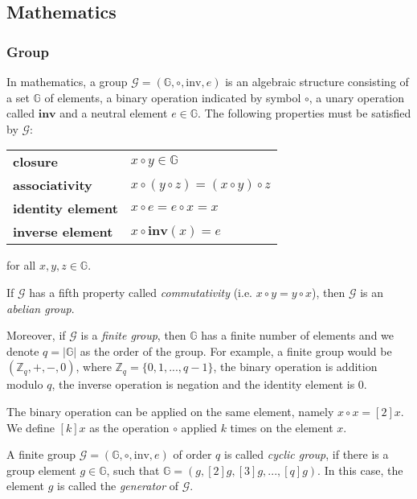 \subsection{Mathematics} \label{app: mathematics}


\subsubsection{Group}
In mathematics, a group $\mathcal{G} = (\mathbb{G}, \circ, \mathrm{inv}, e)$ is an algebraic structure consisting of a set $\mathbb{G}$ of elements, a binary operation indicated by symbol $\circ$, a unary operation called $\mathbf{inv}$ and a neutral element $e \in \mathbb{G}$. The following properties must be satisfied by $\mathcal{G}$:

\begin{center}
\begin{tabular}{ l l }
 \textbf{closure} & $x \circ y \in \mathbb{G}$ \\ 
 \textbf{associativity} & $x \circ (y \circ z) = (x \circ y) \circ z$ \\  
 \textbf{identity element} & $x \circ e = e \circ x = x$ \\
 \textbf{inverse element} & $x \circ \mathbf{inv}(x) = e$
\end{tabular}
\end{center}
for all $x, y, z \in \mathbb{G}$.

If $\mathcal{G}$ has a fifth property called \textit{commutativity} (i.e. $x \circ y = y \circ x$), then $\mathcal{G}$ is an \textit{abelian group}. 

Moreover, if $\mathcal{G}$ is a \textit{finite group}, then $\mathbb{G}$ has a finite number of elements and we denote $q = |\mathbb{G}|$ as the order of the group. For example, a finite group would be $(\mathbb{Z}_q, +, -, 0)$, where $\mathbb{Z}_q  = \{0, 1, ..., q-1\}$, the binary operation is addition modulo $q$, the inverse operation is negation and the identity element is 0.

The binary operation can be applied on the same element, namely $x \circ x = [2]x$. We define $[k]x$ as the operation $\circ$ applied $k$ times on the element $x$. 

A finite group $\mathcal{G} = (\mathbb{G}, \circ, \mathrm{inv}, e)$ of order $q$ is called \textit{cyclic group}, if there is a group element $g \in \mathbb{G}$, such that $\mathbb{G} = (g, [2]g, [3]g, ..., [q]g)$. In this case, the element $g$ is called the \textit{generator} of $\mathcal{G}$.



